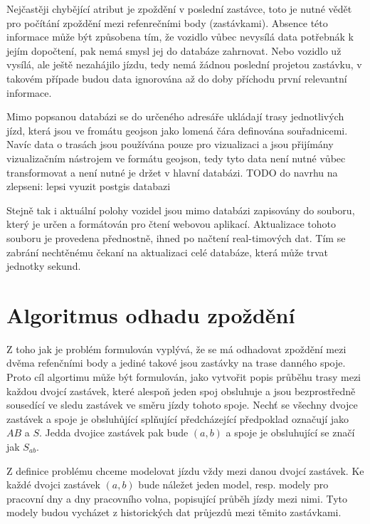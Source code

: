 \bigbreak

Nejčastěji chybějící atribut je zpoždění v poslední zastávce, toto je nutné vědět pro počítání zpoždění mezi refenrečními body (zastávkami). Absence této informace může být způsobena tím, že vozidlo vůbec nevysílá data potřebnák k jejím dopočtení, pak nemá smysl jej do databáze zahrnovat. Nebo vozidlo už vysílá, ale ještě nezahájilo jízdu, tedy nemá žádnou poslední projetou zastávku, v takovém případe budou data ignorována až do doby příchodu první relevantní informace.

\bigbreak

Mimo popsanou databázi se do určeného adresáře ukládají trasy jednotlivých jízd, která jsou ve fromátu \gls{geojson} jako lomená čára definována souřadnicemi. Navíc data o trasách jsou používána pouze pro vizualizaci a jsou přijímány vizualizačním nástrojem ve formátu \gls{geojson}, tedy tyto data není nutné vůbec transformovat a není nutné je držet v hlavní databázi.
TODO do navrhu na zlepseni: lepsi vyuzit postgis databazi

\bigbreak

 Stejně tak i aktuální polohy vozidel jsou mimo databázi zapisovány do souboru, který je určen a formátován pro čtení webovou aplikací. Aktualizace tohoto souboru je provedena přednostně, ihned po načtení real-timových dat. Tím se zabrání nechtěnému čekaní na aktualizaci celé databáze, která může trvat jednotky sekund.









\section{Algoritmus odhadu zpoždění}

Z toho jak je problém formulován vyplývá, že se má odhadovat zpoždění mezi dvěma refenčními body a jediné takové jsou zastávky na trase danného spoje. Proto cíl algortimu může být formulován, jako vytvořit popis průběhu trasy mezi každou dvojcí zastávek, které alespoň jeden spoj obsluhuje a jsou bezprostředně sousedící ve sledu zastávek ve směru jízdy tohoto spoje. Nechť se všechny dvojce zastávek a spoje je obsluhůjící splňující předcházející předpoklad označují jako $AB$ a $S$. Jedda dvojice zastávek pak bude $(a, b)$ a spoje je obsluhující se značí jak $S_{ab}$.

\bigbreak

Z definice problému chceme modelovat jízdu vždy mezi danou dvojcí zastávek. Ke každé dvojci zastávek $(a, b)$ bude náležet jeden model, resp. modely pro pracovní dny a dny pracovního volna, popisující průběh jízdy mezi nimi. Tyto modely budou vycházet z historických dat průjezdů mezi těmito zastávkami.

